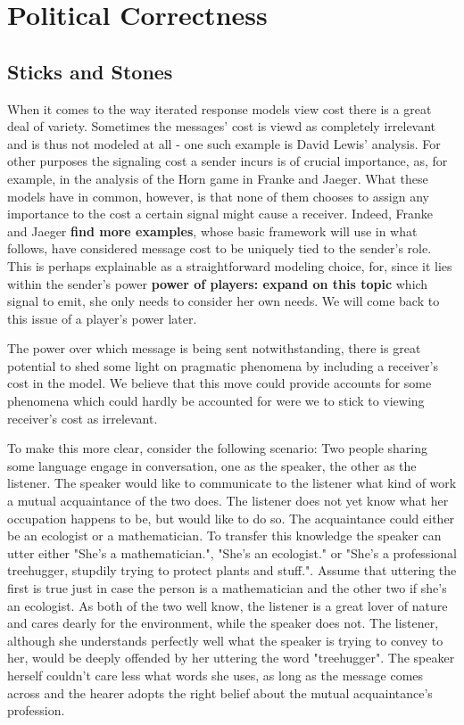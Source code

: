\documentclass{article}
\begin{document}
\section{Political Correctness}
\subsection{Sticks and Stones}
When it comes to the way iterated response models view cost there is a great deal of variety. Sometimes the messages' cost is viewd as completely irrelevant and is thus not modeled at all - one such example is David Lewis' analysis.  For other purposes the signaling cost a sender incurs is of crucial importance, as, for example, in the analysis of the Horn game in Franke and Jaeger. What these models have in common, however, is that none of them chooses to assign any importance to the cost a certain signal might cause a receiver. Indeed, Franke and Jaeger \textbf{find more examples}, whose basic framework will use in what follows, have considered message cost to be uniquely tied to the sender's role. This is perhaps explainable as a straightforward modeling choice, for, since it lies within the sender's power \textbf{power of players: expand on this topic} which signal to emit, she only needs to consider her own needs. We will come back to this issue of a player's power later.

The power over which message is being sent notwithstanding, there is great potential to shed some light on pragmatic phenomena by including a receiver's cost in the model. We believe that this move could provide accounts for some phenomena which could hardly be accounted for were we to stick to viewing receiver's cost as irrelevant.

To make this more clear, consider the following scenario: Two people sharing some language engage in conversation, one as the speaker, the other as the listener. The speaker would like to communicate to the listener what kind of work a mutual acquaintance of the two does. The listener does not yet know what her occupation happens to be, but would like to do so. The acquaintance could either be an ecologist or a mathematician. To transfer this knowledge the speaker can utter either "She's a mathematician.", "She's an ecologist." or "She's a professional treehugger, stupdily trying to protect plants and stuff.". Assume that uttering the first is true just in case the person is a mathematician and the other two if she's an ecologist. As both of the two well know, the listener is a great lover of nature and cares dearly for the environment, while the speaker does not. The listener, although she understands perfectly well what the speaker is trying to convey to her, would be deeply offended by her uttering the word "treehugger". The speaker herself couldn't care less what words she uses, as long as the message comes across and the hearer adopts the right belief about the mutual acquaintance's profession.
\end{document}
